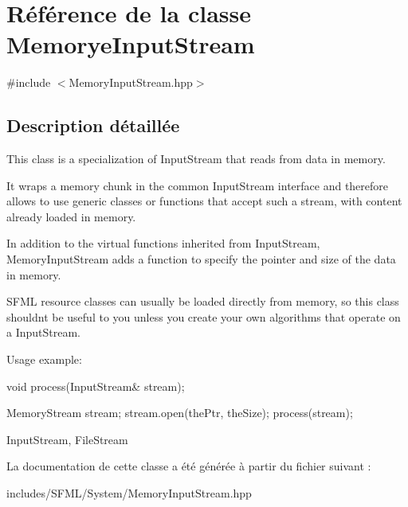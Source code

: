 \hypertarget{classMemoryeInputStream}{}\section{Référence de la classe Memorye\+Input\+Stream}
\label{classMemoryeInputStream}


{\ttfamily \#include $<$Memory\+Input\+Stream.\+hpp$>$}



\subsection{Description détaillée}
This class is a specialization of Input\+Stream that reads from data in memory.

It wraps a memory chunk in the common Input\+Stream interface and therefore allows to use generic classes or functions that accept such a stream, with content already loaded in memory.

In addition to the virtual functions inherited from Input\+Stream, Memory\+Input\+Stream adds a function to specify the pointer and size of the data in memory.

S\+F\+ML resource classes can usually be loaded directly from memory, so this class shouldn\textquotesingle{}t be useful to you unless you create your own algorithms that operate on a Input\+Stream.

Usage example\+: 
\begin{DoxyCode}
\textcolor{keywordtype}{void} process(InputStream& stream);

MemoryStream stream;
stream.open(thePtr, theSize);
process(stream);
\end{DoxyCode}


Input\+Stream, File\+Stream 

La documentation de cette classe a été générée à partir du fichier suivant \+:\begin{DoxyCompactItemize}
\item 
includes/\+S\+F\+M\+L/\+System/Memory\+Input\+Stream.\+hpp\end{DoxyCompactItemize}
